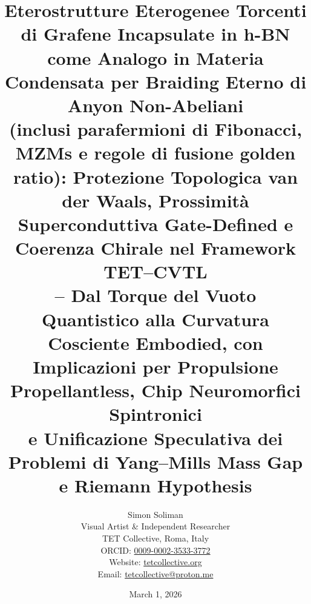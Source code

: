\documentclass[11pt,a4paper]{article}
\theoremstyle{plain}
\theoremstyle{definition}
\begin{document}
\title{Eterostrutture Eterogenee Torcenti di Grafene Incapsulate in h-BN come Analogo in Materia Condensata per Braiding Eterno di Anyon Non-Abeliani \\
(inclusi parafermioni di Fibonacci, MZMs e regole di fusione golden ratio): Protezione Topologica van der Waals, Prossimità Superconduttiva Gate-Defined e Coerenza Chirale nel Framework TET--CVTL \\
\vspace{0.7cm}
-- Dal Torque del Vuoto Quantistico alla Curvatura Cosciente Embodied, con Implicazioni per Propulsione Propellantless, Chip Neuromorfici Spintronici \\
e Unificazione Speculativa dei Problemi di Yang--Mills Mass Gap e Riemann Hypothesis}



\author{Simon Soliman \\
Visual Artist \& Independent Researcher \\
TET Collective, Roma, Italy \\
ORCID: \href{https://orcid.org/0009-0002-3533-3772}{0009-0002-3533-3772} \\
Website: \href{https://tetcollective.org}{tetcollective.org} \\
Email: \href{mailto:tetcollective@proton.me}{tetcollective@proton.me}}




\date{March 1, 2026}


\maketitle



\vspace{0.3cm}
\end{document}
